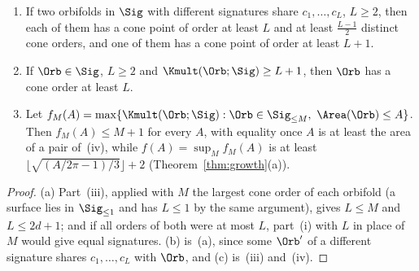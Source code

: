 \begin{corollary}\label{msep:cor}
\leavevmode
\begin{enumerate}[label=(\alph*)]
\item If two orbifolds in $\Sig$ with different signatures share $c_1,\dots,c_L$, $L\ge2$, then each of them has a cone point of order at least $L$ and at least $\frac{L-1}2$ distinct cone orders, and one of them has a cone point of order at least $L+1$.
\item If $\Orb\in\Sig$, $L\ge2$ and $\Kmult(\Orb;\Sig)\ge L+1$, then $\Orb$ has a cone order at least $L$.
\item Let $f_M(A)=\max\{\Kmult(\Orb;\Sig):\Orb\in\Sig_{\le M},\ \Area(\Orb)\le A\}$. Then $f_M(A)\le M+1$ for every $A$, with equality once $A$ is at least the area of a pair of~(iv), while $f(A)=\sup_Mf_M(A)$ is at least $\lfloor\sqrt{(A/2\pi-1)/3}\rfloor+2$ (Theorem~\ref{thm:growth}(a)).
\end{enumerate}
\end{corollary}

\begin{proof}
(a) Part~(iii), applied with $M$ the largest cone order of each orbifold (a surface lies in $\Sig_{\le1}$ and has $L\le1$ by the same argument), gives $L\le M$ and $L\le2d+1$; and if all orders of both were at most $L$, part~(i) with $L$ in place of $M$ would give equal signatures. (b) is~(a), since some $\Orb'$ of a different signature shares $c_1,\dots,c_L$ with $\Orb$, and (c) is~(iii) and~(iv).
\end{proof}
